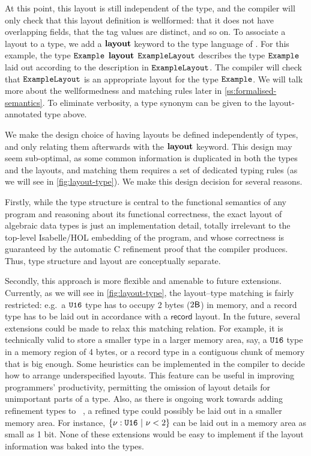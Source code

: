 At this point, this layout is still independent of the \cogent type, and the compiler will only check
that this layout definition is wellformed: that it does not have overlapping fields, that the tag values
are distinct, and so on. To associate a layout to a type, we add a $\mathbf{layout}$ keyword to the type language of \cogent. For this example, the type $\texttt{Example}$ $\mathbf{layout}$ $\texttt{ExampleLayout}$ describes the type $\texttt{Example}$ laid out according to the description in $\texttt{ExampleLayout}$. The compiler will check that $\texttt{ExampleLayout}$ is an appropriate layout for the \cogent type $\texttt{Example}$. We will talk more about the wellformedness and matching rules later
in \autoref{ss:formalised-semantics}. To eliminate verbosity, a type synonym can be given to the layout-annotated type above.


We make the design choice of having \dargent layouts be defined independently 
of \cogent types, and only relating them afterwards with the $\mathbf{layout}$
keyword. This design may seem sub-optimal, as some common information is duplicated
in both the types and the layouts, and matching them requires a set of
dedicated typing rules (as we will
see in \autoref{fig:layout-type}). We make this design decision for several reasons.

Firstly, while the \cogent type structure is central to the functional semantics of any \cogent
program and reasoning about its functional correctness, the exact layout of algebraic data types is just an
implementation detail, totally irrelevant to the top-level Isabelle/HOL
embedding of the \cogent program, and whose correctness is guaranteed by the automatic
C refinement proof that the \cogent compiler produces. 
%
Thus, type structure and layout are conceptually separate.

Secondly, this approach is more flexible and amenable to future
extensions. Currently, as we will see in \autoref{fig:layout-type}, the
layout--type matching is fairly restricted: e.g.\ a $\texttt{U16}$
type has to occupy 2 bytes ($2\mathsf{B}$) in memory, and a record type has
to be laid out in accordance with a $\mathsf{record}$ layout.  In the
future, several extensions could be made to relax this matching
relation. For example, it is technically valid to store a smaller type
in a larger memory area, say, a $\texttt{U16}$ type in a memory region
of 4 bytes, or a record type in a contiguous chunk of memory that is big
enough. Some heuristics can be implemented in the compiler to decide how
to arrange underspecified layouts. This feature can be useful in
improving programmers' productivity, permitting the omission of layout
details for unimportant parts of a type. Also, as there is ongoing work
towards adding refinement types to \cogent~\citep{Paradeza_20}, a
refined type could possibly be laid out in a smaller memory area. For
instance, $\{ \nu : \texttt{U16}\ |\ \nu < 2 \}$ can be laid out in a
memory area as small as 1 bit. None of these extensions would be easy to
implement if the layout information was baked into the types.

